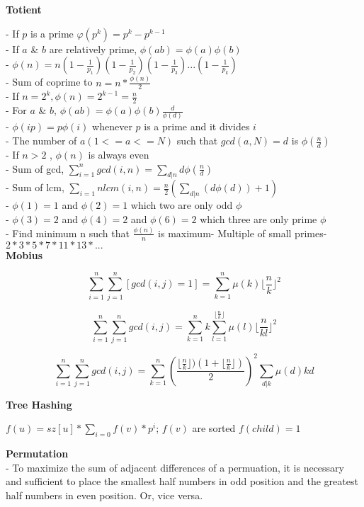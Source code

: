\textbf{Totient}

- If \( p \) is a prime \( φ(p^k) = p^k - p^{k-1} \) \\
- If \( a \) & \( b \) are relatively prime, \( \phi(ab) = \phi(a)\phi(b) \) \\
- \( \phi(n) = n(1-\frac{1}{p_1})(1-\frac{1}{p_2})(1-\frac{1}{p_3})...(1-\frac{1}{p_k}) \) \\
- Sum of coprime to \( n = n * \frac{\phi(n)}{2} \) \\
- If \( n = 2^k, \phi(n) = 2^{k - 1} = \frac{n}{2} \) \\
- For \( a \) & \( b \), \( \phi(ab) = \phi(a)\phi(b)\frac{d}{\phi(d)} \) \\
- \( \phi (ip) = p \phi(i) \) whenever \( p \) is a prime and it divides \( i \) \\
- The number of \( a (1<= a <=N) \) such that \( gcd(a, N)=d \) is \( \phi(\frac{n}{d}) \) \\
- If \( n > 2 \) , \( \phi(n) \) is always even \\
- Sum of gcd, \( \sum_{i=1}^n gcd(i, n) = \sum_{d|n} d \phi(\frac{n}{d}) \) \\
- Sum of lcm, \( \sum_{i=1}{n}lcm(i, n) = \frac{n}{2}(\sum_{d|n}(d \phi(d))+1) \) \\
- \( \phi(1) = 1 \) and \( \phi(2) = 1 \) which two are only odd \( \phi \) \\
- \( \phi(3) = 2 \) and \( \phi(4) = 2 \) and \( \phi(6) = 2 \) which three are only prime \( \phi \) \\
- Find minimum n such that $ \frac{\phi(n)} {n} $ is  maximum- Multiple of small primes- $ 2 * 3 * 5 * 7 * 11 * 13 * ... $ \\

\textbf{Mobius}

\[ \sum_{i = 1}^n \sum_{j = 1}^n [gcd(i, j) = 1] = \sum_{k = 1}^n \mu(k) \lfloor \frac{n}{k} \rfloor^2 \]

\[ \sum_{i = 1}^n \sum_{j = 1}^n gcd(i, j) = \sum_{k = 1}^n k \sum_{l = 1}^{\lfloor \frac{n}{k} \rfloor} \mu(l) \lfloor {\frac{n}{kl}} \rfloor^2 \]

\[ \sum_{i = 1}^n \sum_{j = 1}^n gcd(i, j) = \sum_{k = 1}^n (\frac{\lfloor \frac{n}{k} \rfloor) (1 + \lfloor \frac{n}{k} \rfloor) }{2})^2 \sum_{d | k} \mu (d) kd \]

\textbf{Tree Hashing}

\( f(u) = sz[u] * \sum_{i = 0} f(v) * p^{i} \);    \( f(v) \) are sorted \)
\( f(child) = 1 \)

\textbf{Permutation} \\
- To maximize the sum of adjacent differences of a permuation, it is necessary and sufficient to place the smallest half numbers in odd position and the greatest half numbers in even position. Or, vice versa.

